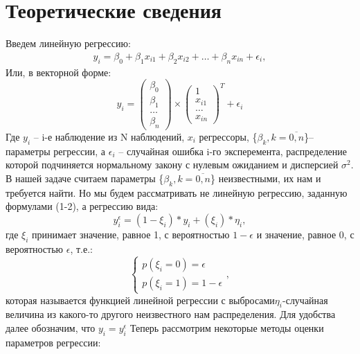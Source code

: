 \documentclass[12pt]{article}
\begin{document}
\section{Теоретические сведения}
Введем линейную регрессию:\hfill\break
\begin{eqnarray}
    y_i=\beta_0+\beta_1 x_{i1}+\beta_2 x_{i2}+\dots+\beta_n x_{in}+\epsilon_i,
\end{eqnarray}
Или, в векторной форме:
\begin{equation}
    y_i= 
    \begin{pmatrix}
        \beta_0\\
        \beta_1\\
        \dots\\
        \beta_n
    \end{pmatrix}\times
    \begin{pmatrix}
        1\\
        x_{i1}\\
        \dots\\
        x_{in}
    \end{pmatrix}^{T}+ \epsilon_i
\end{equation}
Где $y_i$ -- i-е наблюдение из N наблюдений, $x_i$ регрессоры, \{$\beta_k, k=\overline{0,n}$\}-- параметры регрессии, а $\epsilon_i$ -- случайная ошибка i-го эксперемента, распределение которой подчиняется нормальному закону с нулевым ожиданием и дисперсией $\sigma^2$.\hfill\break
В нашей задаче считаем параметры \{$\beta_k, k=\overline{0,n}$\} неизвестными, их нам и требуется найти.\hfill\break
Но мы будем рассматривать не линейную регрессию, заданную формулами (1-2), а регрессию вида:
\begin{equation}
    y_i^{\epsilon}=(1-\xi_i)*y_i+ (\xi_i)*\eta_i,
\end{equation}
где $\xi_i$ принимает значение, равное 1, с вероятностью $1-\epsilon$ и значение, равное 0, с вероятностью $\epsilon$, т.е.:
\begin{equation}
    \begin{cases}
        p(\xi_i=0)=\epsilon\\
        p(\xi_i=1)=1-\epsilon
    \end{cases},
\end{equation}
которая называется функцией линейной регрессии с выбросами$\eta_i$-случайная величина из какого-то другого неизвестного нам распределения.\hfill\break
Для удобства далее обозначим, что $y_i=y_i^{\epsilon}$\hfill\break
Теперь рассмотрим некоторые методы оценки параметров регрессии:
\end{document}
